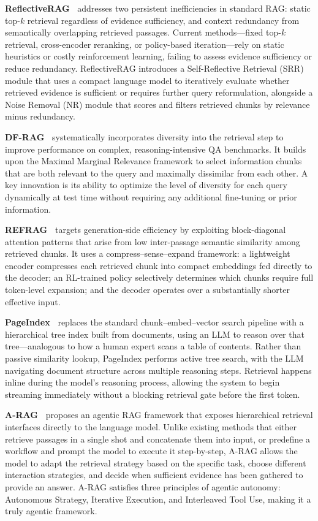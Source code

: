 \documentclass{llmxive}
\begin{document}
\noindent
\textbf{ReflectiveRAG~\cite{verma-etal-2026-reflectiverag}} addresses two persistent inefficiencies in standard RAG: static top-$k$ retrieval regardless of evidence sufficiency, and context redundancy from semantically overlapping retrieved passages. Current methods—fixed top-$k$ retrieval, cross-encoder reranking, or policy-based iteration—rely on static heuristics or costly reinforcement learning, failing to assess evidence sufficiency or reduce redundancy.  ReflectiveRAG introduces a Self-Reflective Retrieval (SRR) module that uses a compact language model to iteratively evaluate whether retrieved evidence is sufficient or requires further query reformulation, alongside a Noise Removal (NR) module that scores and filters retrieved chunks by relevance minus redundancy.

\noindent
\textbf{DF-RAG~\cite{khan-etal-2026-df}} systematically incorporates diversity into the retrieval step to improve performance on complex, reasoning-intensive QA benchmarks. It builds upon the Maximal Marginal Relevance framework to select information chunks that are both relevant to the query and maximally dissimilar from each other. A key innovation is its ability to optimize the level of diversity for each query dynamically at test time without requiring any additional fine-tuning or prior information.

\noindent
\textbf{REFRAG~\cite{lin2025refrag}} targets generation-side efficiency by exploiting block-diagonal attention patterns that arise from low inter-passage semantic similarity among retrieved chunks. It uses a compress–sense–expand framework: a lightweight encoder compresses each retrieved chunk into compact embeddings fed directly to the decoder; an RL-trained policy selectively determines which chunks require full token-level expansion; and the decoder operates over a substantially shorter effective input.

\noindent
\textbf{PageIndex~\cite{zhang2025pageindex}} replaces the standard chunk–embed–vector search pipeline with a hierarchical tree index built from documents, using an LLM to reason over that tree—analogous to how a human expert scans a table of contents.  Rather than passive similarity lookup, PageIndex performs active tree search, with the LLM navigating document structure across multiple reasoning steps. Retrieval happens inline during the model's reasoning process, allowing the system to begin streaming immediately without a blocking retrieval gate before the first token.

\noindent
\textbf{A-RAG~\cite{du2026aragscalingagenticretrievalaugmented}} proposes an agentic RAG framework that exposes hierarchical retrieval interfaces directly to the language model. Unlike existing methods that either retrieve passages in a single shot and concatenate them into input, or predefine a workflow and prompt the model to execute it step-by-step, A-RAG allows the model to adapt the retrieval strategy based on the specific task, choose different interaction strategies, and decide when sufficient evidence has been gathered to provide an answer. A-RAG satisfies three principles of agentic autonomy: Autonomous Strategy, Iterative Execution, and Interleaved Tool Use, making it a truly agentic framework.
\end{document}
